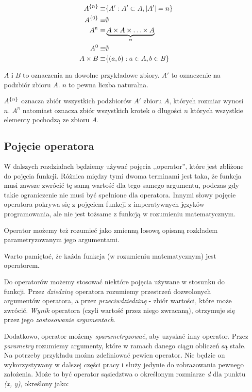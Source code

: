 \documentclass[./FM_mgr.tex]{subfiles}
\begin{document}
\begin{align}
	{A}^{ \{ n \}} \equiv &\{ A': A' \subset A, |A'|=n  \} \\
	{A}^{ \{ 0 \}} \equiv &\emptyset \\
	A^n \equiv &\underbrace{A \times A \times \ldots \times A}_{n} \\
	A^0 \equiv &\emptyset \\
	A \times B \equiv &\{ (a, b): a \in A, b \in B \}
\end{align}

$A$ i $B$ to oznaczenia na dowolne przykładowe zbiory. 
$A'$ to oznaczenie na podzbiór zbioru $A$.
$n$ to pewna liczba naturalna.

${A}^{ \{ n \}}$ oznacza zbiór wszystkich podzbiorów $A'$ zbioru $A$, których rozmiar wynosi $n$.
$A^n$ natomiast oznacza zbiór wszystkich krotek o długości $n$ których wszystkie elementy pochodzą ze zbioru $A$.

\subsection{Pojęcie operatora} \label{subsection:operator}

W dalszych rozdziałach będziemy używać pojęcia ,,operator'', które jest zbliżone do pojęcia funkcji. 
Różnica między tymi dwoma terminami jest taka, że funkcja musi zawsze zwrócić tę samą wartość dla tego samego argumentu, podczas gdy takie ograniczenie nie musi być spełnione dla operatora. Innymi słowy pojęcie operatora pokrywa się z pojęciem funkcji z imperatywnych języków programowania, ale nie jest tożsame z funkcją w rozumieniu matematycznym.

Operator możemy też rozumieć jako zmienną losową opisaną rozkładem parametryzowanym jego argumentami.

Warto pamiętać, że każda funkcja (w rozumieniu matematycznym) jest operatorem.

Do operatorów możemy stosować niektóre pojęcia używane w stosunku do funkcji. 
Przez \emph{dziedzinę} operatora rozumiemy przestrzeń dozwolonych argumentów operatora, a przez \emph{przeciwdziedzinę} - zbiór wartości, które może zwrócić.
\emph{Wynik} operatora (czyli wartość przez niego zwracaną), otrzymuje się przez jego \emph{zastosowanie} \emph{argumentach}.

Dodatkowo, operator możemy \emph{sparametryzować}, aby uzyskać inny operator. 
Przez \emph{parametry} rozumiemy argumenty, które w ramach danego ciągu obliczeń są stałe. 
Na potrzeby przykładu można zdefiniować pewien operator.
Nie będzie on wykorzystywany w dalszej części pracy i służy jedynie do zobrazowania pewnego założenia.
Może to być operator sąsiedztwa o określonym rozmiarze \emph{d} dla punktu \emph{(x, y)}, określony jako:
\end{document}
